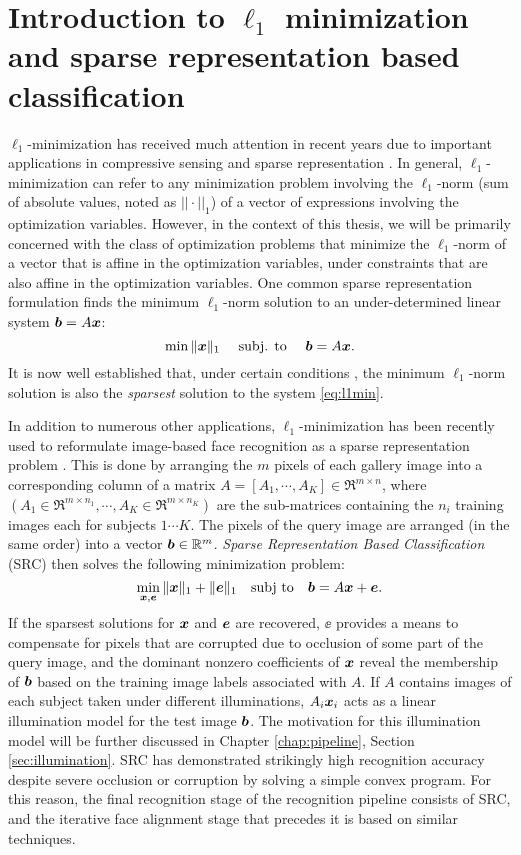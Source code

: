 \section{Introduction to $\ell_1$ minimization and sparse representation based classification}
%
$\ell_1$-minimization has received much attention in recent years due to
important applications in compressive sensing \cite{BrucksteinA2007} and sparse
representation \cite{WrightJ2010-PIEEE}.  
In general, $\ell_1$-minimization can refer to any minimization problem involving the 
$\ell_1$-norm (sum of absolute values, noted as $||\cdot||_1$) of a vector of expressions involving the optimization
variables. However, in the context of this thesis, we will be primarily concerned with
the class of optimization problems that minimize the $\ell_1$-norm of a vector that
is affine in the optimization variables, under constraints that are also affine in the optimization variables.
One common sparse representation formulation finds the minimum $\ell_1$-norm solution to an
under-determined linear system $\boldsymbol{b}=A{\boldsymbol{x}}$:
%
\begin{equation} \min \|{\boldsymbol{x}}\|_1\quad \mbox{ subj. to }\quad \boldsymbol{b} = A{\boldsymbol{x}}.
\label{eq:l1min} \end{equation}
%
It is now well established that, under certain conditions
\cite{CandesE2005-IT_1,DonohoD2004}, the minimum $\ell_1$-norm solution is also
the \emph{sparsest} solution to the system \eqref{eq:l1min}.

In addition to numerous other applications, $\ell_1$-minimization has been 
recently used to reformulate image-based face recognition as a sparse representation problem
\cite{WrightJ2009-PAMI}.  This is done by arranging the $m$ pixels of each gallery image into a corresponding
column of a matrix 
$A = [A_1, \cdots, A_K]\in\Re^{m\times n}$,
where 
$(A_1\in\Re^{m\times n_1}, \cdots, A_K\in\Re^{m\times n_K})$
are the sub-matrices containing 
the $n_i$ training images each for subjects $1 \cdots K$.
The pixels of the query image are arranged (in the same order) into a vector $\boldsymbol{b}\in\mathbb R^m$. 
\emph{Sparse Representation Based
Classification} (SRC) then solves the following minimization problem:
\begin{equation}
\min_{{\boldsymbol{x}}, {\boldsymbol{e}}} \| {\boldsymbol{x}} \|_1 + \|{\boldsymbol{e}}\|_1 \quad \textup{subj to} \quad \boldsymbol{b} = A {\boldsymbol{x}} + {\boldsymbol{e}}.
\label{eq:l1min_denoise}
\end{equation}
If the sparsest solutions for ${\boldsymbol{x}}$ and $\boldsymbol{e}$ are recovered, $\ee$ provides a
means to compensate for pixels that are corrupted due to occlusion of some part of the query
image, and the dominant nonzero coefficients of ${\boldsymbol{x}}$ reveal the membership of
$\boldsymbol{b}$ based on the training image labels associated with $A$. 
If $A$ contains images of each subject taken under different illuminations, 
$A_i{\boldsymbol{x}}_i$ acts as a linear illumination model for the test image $\boldsymbol{b}$.  The motivation
for this illumination model will be further discussed in Chapter \ref{chap:pipeline}, Section \ref{sec:illumination}.
SRC has demonstrated strikingly high recognition accuracy
despite severe occlusion or corruption by solving a simple convex program.  For
this reason, the final recognition stage of the recognition pipeline consists of
SRC, and the iterative face alignment stage that precedes it is based on
similar techniques.

